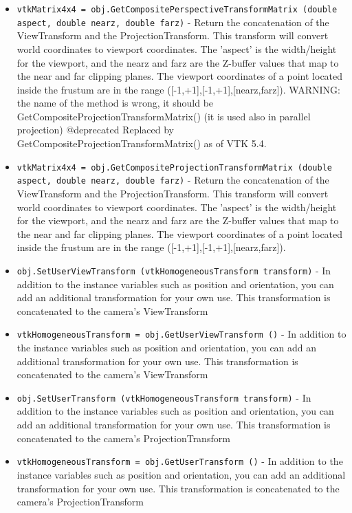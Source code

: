 \begin{itemize}
\item  \verb|vtkMatrix4x4 = obj.GetCompositePerspectiveTransformMatrix (double aspect, double nearz, double farz)| -  Return the concatenation of the ViewTransform and the
 ProjectionTransform.  This transform will convert world
 coordinates to viewport coordinates.  The 'aspect' is the
 width/height for the viewport, and the nearz and farz are the
 Z-buffer values that map to the near and far clipping planes.
 The viewport coordinates of a point located inside the frustum are in the
 range ([-1,+1],[-1,+1],[nearz,farz]).
 WARNING: the name of the method is wrong, it should be
 GetCompositeProjectionTransformMatrix() (it is used also in parallel
 projection)
 @deprecated Replaced by GetCompositeProjectionTransformMatrix() as of
 VTK 5.4.

\item  \verb|vtkMatrix4x4 = obj.GetCompositeProjectionTransformMatrix (double aspect, double nearz, double farz)| -  Return the concatenation of the ViewTransform and the
 ProjectionTransform.  This transform will convert world
 coordinates to viewport coordinates.  The 'aspect' is the
 width/height for the viewport, and the nearz and farz are the
 Z-buffer values that map to the near and far clipping planes.
 The viewport coordinates of a point located inside the frustum are in the
 range ([-1,+1],[-1,+1],[nearz,farz]).

\item  \verb|obj.SetUserViewTransform (vtkHomogeneousTransform transform)| -  In addition to the instance variables such as position and orientation,
 you can add an additional transformation for your own use.  This
 transformation is concatenated to the camera's ViewTransform

\item  \verb|vtkHomogeneousTransform = obj.GetUserViewTransform ()| -  In addition to the instance variables such as position and orientation,
 you can add an additional transformation for your own use.  This
 transformation is concatenated to the camera's ViewTransform

\item  \verb|obj.SetUserTransform (vtkHomogeneousTransform transform)| -  In addition to the instance variables such as position and orientation,
 you can add an additional transformation for your own use.  This
 transformation is concatenated to the camera's ProjectionTransform

\item  \verb|vtkHomogeneousTransform = obj.GetUserTransform ()| -  In addition to the instance variables such as position and orientation,
 you can add an additional transformation for your own use.  This
 transformation is concatenated to the camera's ProjectionTransform


\end{itemize}
